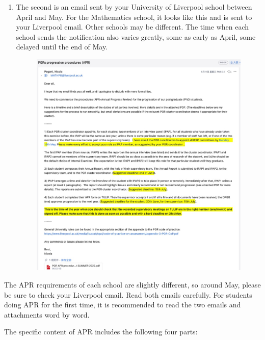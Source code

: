 \begin{enumerate}
    \item 
        \begin{minipage}{0.3\textwidth}
            The second is an email sent by your University of Liverpool school between April and May. For the Mathematics school, it looks like this and is sent to your Liverpool email. Other schools may be different. The time when each school sends the notification also varies greatly, some as early as April, some delayed until the end of May.
        \end{minipage}
        \begin{minipage}{0.63\textwidth}
            \begin{figure}[H]
                \includegraphics[width=0.95\columnwidth, right]{author-folder/Kai.Wu/APR_liverpool_email.jpg}
            \end{figure}
        \end{minipage}

\end{enumerate}

The APR requirements of each school are slightly different, so around May, please be sure to check your Liverpool email. Read both emails carefully. For students doing APR for the first time, it is recommended to read the two emails and attachments word by word.

The specific content of APR includes the following four parts:

